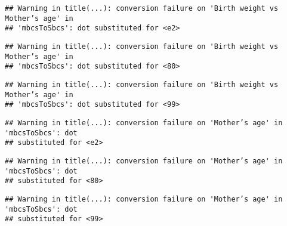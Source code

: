 \documentclass[]{article}
\newenvironment{Shaded}{\begin{snugshade}}{\end{snugshade}}
\newcommand{\DataTypeTok}[1]{\textcolor[rgb]{0.13,0.29,0.53}{#1}}
\newcommand{\KeywordTok}[1]{\textcolor[rgb]{0.13,0.29,0.53}{\textbf{#1}}}
\newcommand{\NormalTok}[1]{#1}
\newcommand{\OperatorTok}[1]{\textcolor[rgb]{0.81,0.36,0.00}{\textbf{#1}}}
\newcommand{\StringTok}[1]{\textcolor[rgb]{0.31,0.60,0.02}{#1}}
\begin{document}
\begin{Shaded}
\end{Shaded}

\begin{verbatim}
## Warning in title(...): conversion failure on 'Birth weight vs Mother’s age' in
## 'mbcsToSbcs': dot substituted for <e2>
\end{verbatim}

\begin{verbatim}
## Warning in title(...): conversion failure on 'Birth weight vs Mother’s age' in
## 'mbcsToSbcs': dot substituted for <80>
\end{verbatim}

\begin{verbatim}
## Warning in title(...): conversion failure on 'Birth weight vs Mother’s age' in
## 'mbcsToSbcs': dot substituted for <99>
\end{verbatim}

\begin{verbatim}
## Warning in title(...): conversion failure on 'Mother’s age' in 'mbcsToSbcs': dot
## substituted for <e2>
\end{verbatim}

\begin{verbatim}
## Warning in title(...): conversion failure on 'Mother’s age' in 'mbcsToSbcs': dot
## substituted for <80>
\end{verbatim}

\begin{verbatim}
## Warning in title(...): conversion failure on 'Mother’s age' in 'mbcsToSbcs': dot
## substituted for <99>
\end{verbatim}

\begin{Shaded}
\end{Shaded}
\end{document}
